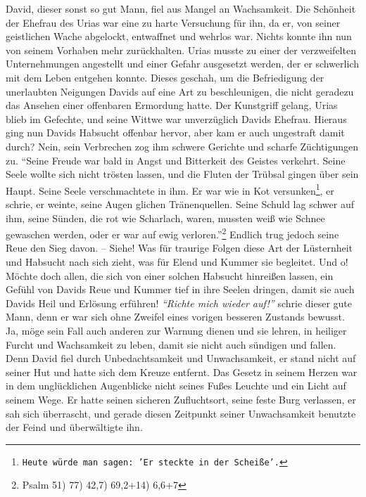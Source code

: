 David, dieser sonst so gut Mann, fiel aus Mangel an
Wachsamkeit. Die Schönheit
der Ehefrau des Urias war eine zu harte
Versuchung für ihn, da er, von seiner
geistlichen Wache abgelockt, entwaffnet und wehrlos war. Nichts konnte ihn nun
von seinem Vorhaben mehr zurückhalten. Urias musste zu
einer der verzweifelten
Unternehmungen angestellt und einer Gefahr ausgesetzt werden, der er schwerlich
mit dem Leben entgehen konnte. Dieses geschah, um die Befriedigung der
unerlaubten Neigungen Davids auf eine Art zu beschleunigen, die nicht geradezu
das Ansehen einer offenbaren Ermordung hatte. Der Kunstgriff gelang, Urias blieb
im Gefechte, und seine Wittwe war unverzüglich Davids Ehefrau. Hieraus ging nun
Davids Habsucht offenbar hervor, aber kam er auch ungestraft
damit durch? Nein,
sein Verbrechen zog ihm schwere Gerichte und scharfe Züchtigungen zu.
"`Seine
Freude war bald in Angst und Bitterkeit des Geistes verkehrt. Seine Seele
wollte sich nicht trösten lassen, und die Fluten der Trübsal gingen über sein
Haupt. Seine Seele verschmachtete in ihm. Er war wie in Kot
versunken\footnote{\texttt{Heute würde man sagen: 'Er steckte in der Scheiße'.}},
er schrie, er weinte,
seine Augen glichen Tränenquellen. Seine Schuld lag schwer auf ihm, seine
Sünden, die rot wie Scharlach, waren, mussten weiß wie Schnee gewaschen
werden, oder er war auf ewig verloren."'\footnote{Psalm 51) 77) 42,7) 69,2+14) 6,6+7}
Endlich trug jedoch seine Reue den Sieg davon. -- Siehe! Was für
traurige Folgen diese Art der Lüsternheit und Habsucht nach
sich zieht, was für
Elend und Kummer sie begleitet. Und o! Möchte doch allen, die sich von einer
solchen Habsucht hinreißen lassen, ein Gefühl von Davids Reue und Kummer tief in
ihre Seelen dringen, damit sie auch Davids Heil und Erlösung erführen!
\textit{"`Richte
mich wieder auf!"'} schrie dieser gute Mann, denn er war sich ohne Zweifel eines
vorigen besseren Zustands bewusst. Ja, möge sein Fall auch anderen zur Warnung
dienen und sie lehren, in heiliger Furcht und Wachsamkeit
zu leben, damit sie
nicht auch sündigen und fallen. Denn David fiel durch Unbedachtsamkeit und
Unwachsamkeit, er stand nicht auf seiner Hut und hatte sich dem Kreuze
entfernt. Das Gesetz in seinem Herzen war in dem
unglücklichen Augenblicke nicht
seines Fußes Leuchte und ein Licht auf seinem Wege. Er hatte seinen sicheren
Zufluchtsort, seine feste Burg verlassen, er sah sich überrascht, und gerade
diesen Zeitpunkt seiner Unwachsamkeit benutzte der Feind und überwältigte ihn.

